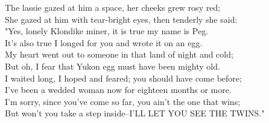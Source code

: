 \begin{poemblock}
The lassie gazed at him a space, her cheeks grew rosy red;\\
She gazed at him with tear-bright eyes, then tenderly she said:\\
"Yes, lonely Klondike miner, it is true my name is Peg.\\
It's also true I longed for you and wrote it on an egg.\\
My heart went out to someone in that land of night and cold;\\
But oh, I fear that Yukon egg must have been mighty old.\\
I waited long, I hoped and feared; you should have come before;\\
I've been a wedded woman now for eighteen months or more.\\
I'm sorry, since you've come so far, you ain't the one that wins;\\
But won't you take a step inside--I'LL LET YOU SEE THE TWINS."
\end{poemblock}
